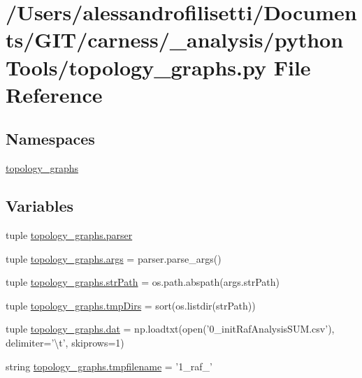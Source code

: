 \hypertarget{a00101}{\section{/\-Users/alessandrofilisetti/\-Documents/\-G\-I\-T/carness/\-\_\-analysis/python\-Tools/topology\-\_\-graphs.py File Reference}
\label{a00101}
}
\subsection*{Namespaces}
\begin{DoxyCompactItemize}
\item 
\hyperlink{a00158}{topology\-\_\-graphs}
\end{DoxyCompactItemize}
\subsection*{Variables}
\begin{DoxyCompactItemize}
\item 
tuple \hyperlink{a00158_ae8f5442ee1adf5cb74402ea355fa8624}{topology\-\_\-graphs.\-parser}
\item 
tuple \hyperlink{a00158_a24c8c694ace179f28bd0178c8a98cc1f}{topology\-\_\-graphs.\-args} = parser.\-parse\-\_\-args()
\item 
tuple \hyperlink{a00158_a700aee16b39b4ad2a88c4ad9b2595a7c}{topology\-\_\-graphs.\-str\-Path} = os.\-path.\-abspath(args.\-str\-Path)
\item 
tuple \hyperlink{a00158_a8eb5b4fb2ce4eb5e86f9fa6b5ba89ce8}{topology\-\_\-graphs.\-tmp\-Dirs} = sort(os.\-listdir(str\-Path))
\item 
tuple \hyperlink{a00158_a0bffd0371cf5a2357be1b52798816c2c}{topology\-\_\-graphs.\-dat} = np.\-loadtxt(open('0\-\_\-init\-Raf\-Analysis\-S\-U\-M.\-csv'), delimiter='\textbackslash{}t', skiprows=1)
\item 
string \hyperlink{a00158_a7c33855a7bcf13e566f1b8026065fa90}{topology\-\_\-graphs.\-tmpfilename} = '1\-\_\-raf\-\_\-'
\end{DoxyCompactItemize}
